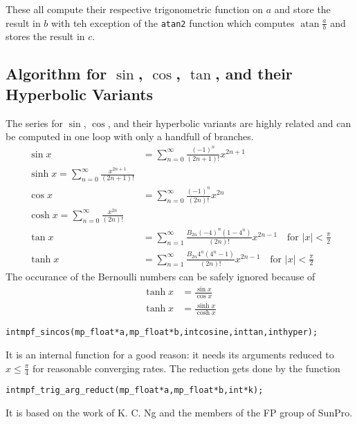\documentclass[a4paper]{book}
\theoremstyle{definition}
\theoremstyle{remark}
\DeclareMathOperator{\atan}{atan}
\begin{document}
These all compute their respective trigonometric function on $a$ and store the result in $b$ with teh exception of the {\texttt{atan2}} function which computes $\atan\frac{a}{b}$ and stores the result in $c$.

\subsection{Algorithm for $\sin$, $\cos$, $\tan$, and their Hyperbolic Variants}
The series for $\sin$, $\cos$, and their hyperbolic variants are highly related and can be computed in one loop with only a handfull of branches.
\begin{align}
\sin x& = \sum^{\infty}_{n=0} \frac{(-1)^n}{(2n+1)!} x^{2n+1}\\
\sinh x = \sum^{\infty}_{n=0} \frac{x^{2n+1}}{(2n+1)!}\\
\cos x& = \sum^{\infty}_{n=0} \frac{(-1)^n}{(2n)!} x^{2n}\\
\cosh x = \sum^{\infty}_{n=0} \frac{x^{2n}}{(2n)!}\\
\tan x& = \sum^{\infty}_{n=1} \frac{B_{2n} (-4)^n (1-4^n)}{(2n)!} x^{2n-1}\quad\text{for } |x| < \frac{\pi}{2} \\
\tanh x& = \sum^{\infty}_{n=1} \frac{B_{2n} 4^n (4^n-1)}{(2n)!} x^{2n-1}\quad\text{for } |x| < \frac{\pi}{2}
\end{align}
The occurance of the Bernoulli numbers can be safely ignored because of
\begin{align}
\tanh x& = \frac{\sin x}{\cos x}\\
\tanh x& = \frac{\sinh x}{\cosh x}
\end{align}

\begin{alltt}
int  mpf_sincos(mp_float * a, mp_float * b, int cosine, int tan, int hyper);
\end{alltt}
It is an internal function for a good reason: it needs its arguments reduced to $x \le \frac{\pi}{4}$ for reasonable converging rates. The reduction gets done by the function
\begin{alltt}
int  mpf_trig_arg_reduct(mp_float * a, mp_float * b, int *k);
\end{alltt}
It is based on the work of K. C. Ng and the members of the FP group of SunPro\cite{ng1992argument}.
\end{document}
